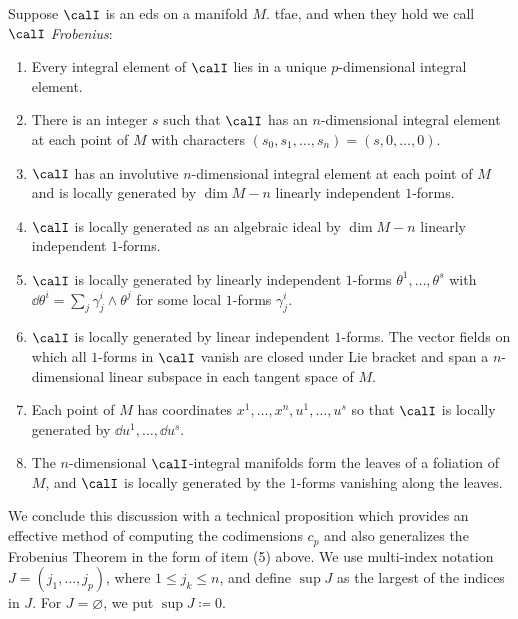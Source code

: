 \begin{thm}\label{thm frobenius iii}
    Suppose $\calI$ is an \gls{eds} on a manifold $M$. \gls{tfae}, and when they hold we call $\calI$ \emph{Frobenius}:
    \begin{enumerate}[label=(\arabic*)]
        \item Every integral element of $\calI$ lies in a unique $p$-dimensional integral element.
        \item There is an integer $s$ such that $\calI$ has an $n$-dimensional integral element at each point of $M$ with characters $(s_0,s_1,\ldots,s_n)=(s,0,\ldots,0)$.
        \item $\calI$ has an involutive $n$-dimensional integral element at each point of $M$ and is locally generated by $\dim M-n$ linearly independent $1$-forms.
        \item $\calI$ is locally generated as an algebraic ideal by $\dim M-n$ linearly independent $1$-forms.
        \item $\calI$ is locally generated by linearly independent $1$-forms $\theta^1,\ldots,\theta^s$ with $\dd\theta^i=\sum_j \gamma_j^i\wedge\theta^j$ for some local $1$-forms $\gamma^i_j$.
        \item $\calI$ is locally generated by linear independent $1$-forms. The vector fields on which all $1$-forms in $\calI$ vanish are closed under Lie bracket and span a $n$-dimensional linear subspace in each tangent space of $M$.
        \item Each point of $M$ has coordinates $x^1,\ldots,x^n,u^1,\ldots,u^s$ so that $\calI$ is locally generated by $\dd u^1,\ldots,\dd u^s$.
        \item The $n$-dimensional $\calI$-integral manifolds form the leaves of a foliation of $M$, and $\calI$ is locally generated by the $1$-forms vanishing along the leaves.
    \end{enumerate}
\end{thm}


We conclude this discussion with a technical proposition which provides an effective method of computing the codimensions $c_p$ and also generalizes the Frobenius Theorem in the form of item (5) above. We use multi-index notation $J=(j_1,\ldots,j_p)$, where $1\leq j_k\leq n$, and define $\sup J$ as the largest of the indices in $J$. For $J=\varnothing$, we put $\sup J\coloneqq 0$.


